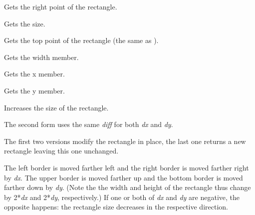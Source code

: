
Gets the right point of the rectangle.


\label{wxrectgetsize}


Gets the size.




\label{wxrectgettop}


Gets the top point of the rectangle (the same as ).


\label{wxrectgetwidth}


Gets the width member.


\label{wxrectgetx}


Gets the x member.


\label{wxrectgety}


Gets the y member.


\label{wxrectinflate}




Increases the size of the rectangle.

The second form uses the same {\it diff} for both {\it dx} and {\it dy}.

The first two versions modify the rectangle in place, the last one returns a
new rectangle leaving this one unchanged.

The left border is moved farther left and the right border is moved farther
right by {\it dx}. The upper border is moved farther up and the bottom border
is moved farther down by {\it dy}. (Note the the width and height of the
rectangle thus change by 2*{\it dx} and 2*{\it dy}, respectively.) If one or
both of {\it dx} and {\it dy} are negative, the opposite happens: the rectangle
size decreases in the respective direction.

